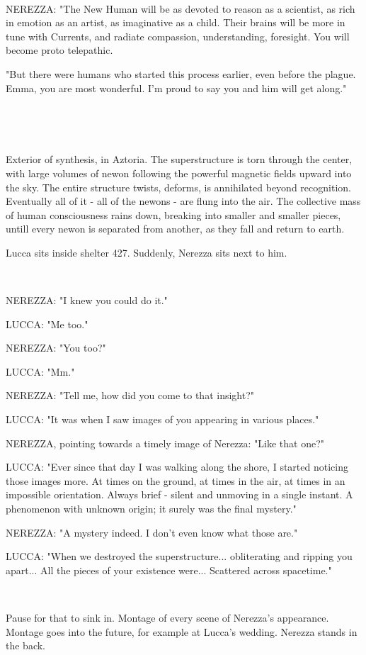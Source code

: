 \documentclass[11pt]{article}
\begin{document}
\ 

NEREZZA: "The New Human will be as devoted to reason as a scientist, as rich in emotion as an artist, as imaginative as a child.
Their brains will be more in tune with Currents, and radiate compassion, understanding, foresight.
You will become proto telepathic.

"But there were humans who started this process earlier, even before the plague.
Emma, you are most wonderful.
I'm proud to say you and him will get along."

\ 

\ 

Exterior of synthesis, in Aztoria.
The superstructure is torn through the center, with large volumes of newon following the powerful magnetic fields upward into the sky. 
The entire structure twists, deforms, is annihilated beyond recognition.
Eventually all of it - all of the newons - are flung into the air.
The collective mass of human consciousness rains down, breaking into smaller and smaller pieces, untill every newon is separated from another, as they fall and return to earth. 

Lucca sits inside shelter 427. 
Suddenly, Nerezza sits next to him.

\ 

NEREZZA: "I knew you could do it."

LUCCA: "Me too."

NEREZZA: "You too?"

LUCCA: "Mm."

NEREZZA: "Tell me, how did you come to that insight?"

LUCCA: "It was when I saw images of you appearing in various places."

NEREZZA, pointing towards a timely image of Nerezza: "Like that one?"

LUCCA: "Ever since that day I was walking along the shore, I started noticing those images more.
At times on the ground, at times in the air, at times in an impossible orientation. 
Always brief - silent and unmoving in a single instant.
A phenomenon with unknown origin; it surely was the final mystery."

NEREZZA: "A mystery indeed. 
I don't even know what those are."

LUCCA: "When we destroyed the superstructure... obliterating and ripping you apart...
All the pieces of your existence were... 
Scattered across spacetime."

\ 

Pause for that to sink in.
Montage of every scene of Nerezza's appearance.
Montage goes into the future, for example at Lucca's wedding.
Nerezza stands in the back.
\end{document}
